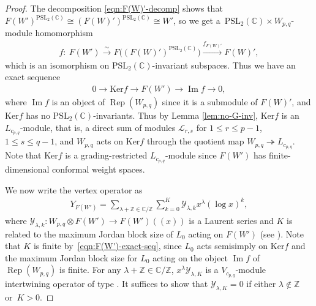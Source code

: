 \documentclass[pdftex]{sigma}
\numberwithin{equation}{section}
\theoremstyle{definition}
\begin{document}
\begin{proof}
The decomposition \eqref{eqn:F(W)'-decomp} shows that $F(W')^{\mathrm{PSL}_2(\mathbb{C})}\cong (F(W)')^{\mathrm{PSL}_2(\mathbb{C})}\cong W'$, so we get a~$\mathrm{PSL}_2(\mathbb{C})\times W_{p,q}$-module homomorphism
\begin{gather*}
f\colon\ F(W') \xrightarrow{ \sim } F\bigl((F(W)')^{\mathrm{PSL}_2(\mathbb{C})}\bigr) \xrightarrow{f_{F(W)'}} F(W)',
\end{gather*}
which is an isomorphism on $\mathrm{PSL}_2(\mathbb{C})$-invariant subspaces.
Thus we have an exact sequence
\begin{gather}\label{eqn:F(W')-exact-seq}
0 \longrightarrow \mathrm{Ker} f \longrightarrow F(W') \longrightarrow \operatorname{Im} f \longrightarrow 0,
\end{gather}
where $\operatorname{Im} f$ is an object of $\operatorname{Rep}(W_{p,q})$ since it is a submodule of $F(W)'$, and $\mathrm{Ker} f$ has no $\mathrm{PSL}_2(\mathbb{C})$-invariants. Thus by Lemma \ref{lem:no-G-inv}, $\mathrm{Ker} f$ is an $L_{c_{p,q}}$-module, that is, a direct sum of modules $\mathcal{L}_{r,s}$ for $1\leq r\leq p-1$, $1\leq s\leq q-1$, and $W_{p,q}$ acts on $\mathrm{Ker} f$ through the quotient map $W_{p,q}\twoheadrightarrow L_{c_{p,q}}$. Note that $\mathrm{Ker} f$ is a grading-restricted $L_{c_{p,q}}$-module since $F(W')$ has finite-dimensional conformal weight spaces.



We now write the vertex operator  as
\begin{gather*}
Y_{F(W')} =\sum_{\lambda+\mathbb{Z}\in\mathbb{C}/\mathbb{Z}}\sum_{k=0}^K \mathcal{Y}_{\lambda,k} x^\lambda (\log x)^k,
\end{gather*}
where $\mathcal{Y}_{\lambda,k}\colon W_{p,q}\otimes F(W')\longrightarrow F(W')((x))$ is a Laurent series and $K$ is related to the maximum Jordan block size of $L_0$ acting on $F(W')$ (see \cite[Proposition 3.20\,(c)]{HLZ2}). Note that $K$ is finite by~\eqref{eqn:F(W')-exact-seq}, since $L_0$ acts semisimply on $\mathrm{Ker} f$ and the maximum Jordan block size for $L_0$ acting on the object $\operatorname{Im} f$ of $\operatorname{Rep}(W_{p,q})$ is finite. For any $\lambda+\mathbb{Z}\in\mathbb{C}/\mathbb{Z}$, $x^\lambda\mathcal{Y}_{\lambda,K}$ is a $V_{c_{p,q}}$-module intertwining operator of type . It suffices to show that $\mathcal{Y}_{\lambda,K}=0$ if either $\lambda\notin\mathbb{Z}$ or~${K>0}$.


\end{proof}
\end{document}
